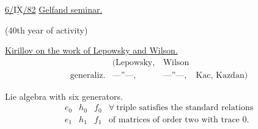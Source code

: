 \underline{6/$\overline{\underline{\mathrm{IX}}}$/82}\qquad
\underline{Gelfand seminar.}

\hfill (40th year of activity)

\underline{Kirillov on the work of Lepowsky and Wilson.}
\[
\begin{array}{rlll}
&(\text{Lepowsky},&\text{Wilson}&\\
\text{generaliz.}&\text{---''---},&\text{---''---},&\text{Kac, Kazdan})
\end{array}
\]

Lie algebra with six generators.
\[
\begin{array}{ccc|l}
e_0&h_0&f_0&\forall\ \text{triple satisfies the standard relations}\\
e_1&h_1&f_1&\text{of matrices of order two with trace }0.
\end{array}
\]


